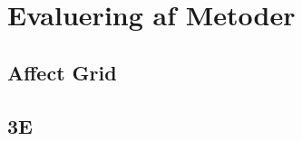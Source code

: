 \chapter{Evaluering af Metoder}\label{ch:evalmet}
\section{Affect Grid}\label{sec:evalAG}
\section{3E}\label{sec:eval3E}
